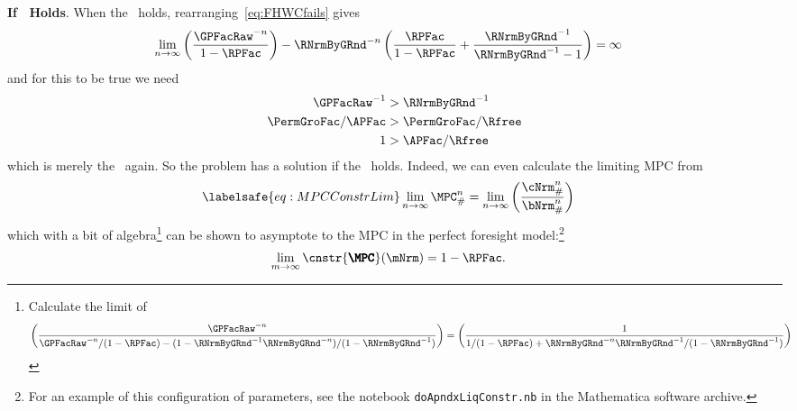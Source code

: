 \documentclass[\econtexRoot/BufferStockTheory]{subfiles}
\begin{document}
\noindent \textbf{If \RIC~Holds}.
When the \RIC~holds, rearranging~\eqref{eq:FHWCfails} gives
\begin{eqnarray*}
  \lim_{n \rightarrow \infty} \left(\frac{\GPFacRaw^{-n}}{1-\RPFac}\right)-\RNrmByGRnd^{-n}\left(\frac{\RPFac}{1-\RPFac}+\frac{\RNrmByGRnd^{-1}}{\RNrmByGRnd^{-1}-1}\right)  & = \infty
\end{eqnarray*}
and for this to be true we need
\begin{eqnarray*}
  \GPFacRaw^{-1}  & > \RNrmByGRnd^{-1}
  \\ \PermGroFac/\APFac  & > \PermGroFac/\Rfree
  \\ 1  & > \APFac/\Rfree
\end{eqnarray*}
which is merely the \RIC~again.
So the problem has a solution if the \RIC~holds.
Indeed,
we can even calculate the limiting MPC from
\begin{equation}\begin{gathered}\begin{aligned}\labelsafe{eq:MPCConstrLim}
  \lim_{n \rightarrow \infty} \MPC^{n}_{\#}  & = \lim_{n \rightarrow \infty} \left(\frac{\cNrm_{\#}^{n}}{\bNrm_{\#}^{n}}\right) 
\end{aligned}\end{gathered}\end{equation}
which with a bit of algebra\footnote{
  Calculate the limit of
  \begin{equation}\begin{gathered}\begin{aligned}
    \left(\frac{\GPFacRaw^{-n}}{\GPFacRaw^{-n}/(1-\RPFac) - (1-\RNrmByGRnd^{-1}\RNrmByGRnd^{-n})/(1-\RNrmByGRnd^{-1})}\right)  & = \left(\frac{1}{1/(1-\RPFac) + \RNrmByGRnd^{-n}\RNrmByGRnd^{-1}/(1-\RNrmByGRnd^{-1})}\right)
  \end{aligned}\end{gathered}\end{equation}} can be shown to asymptote to the MPC in the perfect foresight model:\footnote{For an example of this configuration of parameters, see the notebook \texttt{doApndxLiqConstr.nb} in the Mathematica software  archive.}
\begin{equation}\begin{gathered}\begin{aligned}
  \lim_{m \rightarrow \infty} \cnstr{\pmb{\MPC}}(\mNrm)  & = 1-\RPFac.
\end{aligned}\end{gathered}\end{equation}
\end{document}
